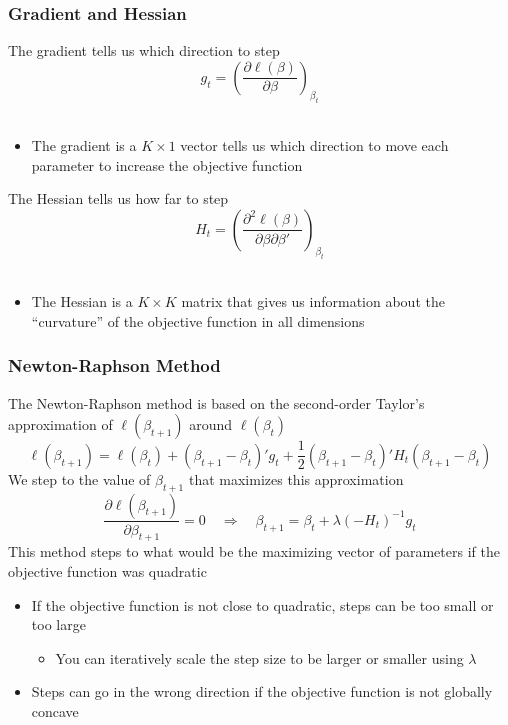 \documentclass{beamer}\usepackage[]{graphicx}\usepackage[]{color}
\begin{document}
\begin{frame}\frametitle{Gradient and Hessian}
    The gradient tells us which direction to step
    $$g_t = \left( \frac{\partial \ell(\beta)}{\partial \beta} \right)_{\beta_t}$$ \\
    \begin{itemize}
        \item The gradient is a $K \times 1$ vector tells us which direction to move each parameter to increase the objective function
    \end{itemize}
    \vspace{3ex}
    The Hessian tells us how far to step
    $$H_t = \left( \frac{\partial^2 \ell(\beta)}{\partial \beta \partial \beta'} \right)_{\beta_t}$$ \\
    \begin{itemize}
        \item The Hessian is a $K \times K$ matrix that gives us information about the ``curvature'' of the objective function in all dimensions
    \end{itemize}
\end{frame}

\begin{frame}\frametitle{Newton-Raphson Method}
    The Newton-Raphson method is based on the second-order Taylor's approximation of $\ell(\beta_{t + 1})$ around $\ell(\beta_t)$
    $$\ell(\beta_{t + 1}) = \ell(\beta_t) + (\beta_{t + 1} - \beta_t)' g_t + \frac{1}{2} (\beta_{t + 1} - \beta_t)' H_t (\beta_{t + 1} - \beta_t)$$
    We step to the value of $\beta_{t + 1}$ that maximizes this approximation
    $$\frac{\partial \ell(\beta_{t + 1})}{\partial \beta_{t + 1}} = 0 \quad \Rightarrow \quad \beta_{t + 1} = \beta_t + \lambda (-H_t)^{-1} g_t$$
    This method steps to what would be the maximizing vector of parameters if the objective function was quadratic
    \begin{itemize}
        \item If the objective function is not close to quadratic, steps can be too small or too large
        \begin{itemize}
            \item You can iteratively scale the step size to be larger or smaller using $\lambda$
        \end{itemize}
        \item Steps can go in the wrong direction if the objective function is not globally concave
    \end{itemize}
\end{frame}
\end{document}
